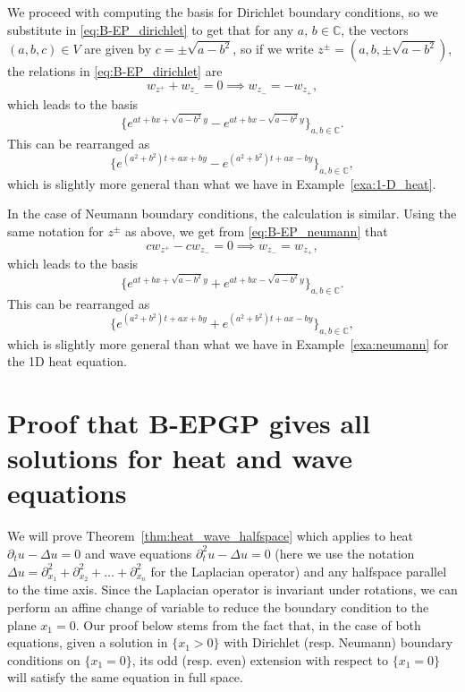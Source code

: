 \documentclass{article} %
\theoremstyle{plain}
\theoremstyle{definition}
\theoremstyle{remark}
\newcommand{\CC}{\mathbb{C}}
\begin{document}
We proceed with computing the basis for Dirichlet boundary conditions, so we substitute in \eqref{eq:B-EP_dirichlet} to get that for any $a,\,b\in \CC$, the vectors $(a,b,c)\in V$ are given by $c=\pm\sqrt{a-b^2}$, so if we write $z^\pm=(a,b,\pm\sqrt{a-b^2})$, the relations in \eqref{eq:B-EP_dirichlet} are
$$
w_{z^+}+w_{z_-}=0\implies w_{z_-}=-w_{z_+},
$$
which leads to the basis
$$
\{e^{at+bx+\sqrt{a-b^2}y}-e^{at+bx-\sqrt{a-b^2}y}\}_{a,b\in\CC}.
$$
This can be rearranged as 
$$
\{e^{{(a^2+b^2)}t+ax+by}-e^{{(a^2+b^2)}t+ax-by}\}_{a,b\in\CC},
$$
which is slightly more general than what we have in Example~\ref{exa:1-D_heat}.

In the case of Neumann boundary conditions, the calculation is similar. Using the same notation for $z^{\pm}$ as above, we get from \eqref{eq:B-EP_neumann} that
$$
cw_{z^+}-cw_{z_-}=0\implies w_{z_-}=w_{z_+},
$$
which leads to the basis
$$
\{e^{at+bx+\sqrt{a-b^2}y}+e^{at+bx-\sqrt{a-b^2}y}\}_{a,b\in\CC}.
$$
This can be rearranged as 
$$
\{e^{{(a^2+b^2)}t+ax+by}+e^{{(a^2+b^2)}t+ax-by}\}_{a,b\in\CC},
$$
which is slightly more general than what we have in Example~\ref{exa:neumann} for the 1D heat equation. 
\section{Proof that B-EPGP gives all solutions for heat and wave equations}\label{sec:proof}
We will prove Theorem~\ref{thm:heat_wave_halfspace} which applies to heat $\partial_tu-\Delta u=0$ and wave equations $\partial^2_{t}u-\Delta u=0$ (here we use the notation $\Delta u=\partial^2_{x_1}+\partial^2_{x_2}+\ldots+\partial^2_{x_n}$ for the Laplacian operator) and any halfspace parallel to the time axis. Since the Laplacian operator is invariant under rotations, we can perform an affine change of variable to reduce the boundary condition to the plane $x_1=0$. Our proof below stems from the fact that, in the case of both equations, given a solution in $\{x_1>0\}$ with Dirichlet (resp. Neumann) boundary conditions on $\{x_1=0\}$, its odd (resp. even) extension with respect to $\{x_1=0\}$ will satisfy the same equation in full space.
\end{document}
